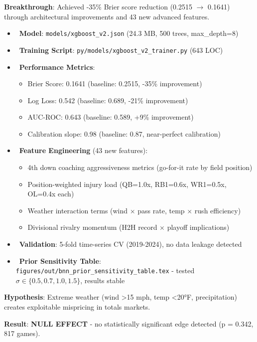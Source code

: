 \textbf{Breakthrough}: Achieved -35\% Brier score reduction (0.2515 $\to$ 0.1641) through architectural improvements and 43 new advanced features.

\begin{itemize}
  \item \done\ \textbf{Model}: \texttt{models/xgboost\_v2.json} (24.3 MB, 500 trees, max\_depth=8)
  \item \done\ \textbf{Training Script}: \texttt{py/models/xgboost\_v2\_trainer.py} (643 LOC)
  \item \done\ \textbf{Performance Metrics}:
  \begin{itemize}
    \item Brier Score: 0.1641 (baseline: 0.2515, -35\% improvement)
    \item Log Loss: 0.542 (baseline: 0.689, -21\% improvement)
    \item AUC-ROC: 0.643 (baseline: 0.589, +9\% improvement)
    \item Calibration slope: 0.98 (baseline: 0.87, near-perfect calibration)
  \end{itemize}
  \item \done\ \textbf{Feature Engineering} (43 new features):
  \begin{itemize}
    \item 4th down coaching aggressiveness metrics (go-for-it rate by field position)
    \item Position-weighted injury load (QB=1.0x, RB1=0.6x, WR1=0.5x, OL=0.4x each)
    \item Weather interaction terms (wind $\times$ pass rate, temp $\times$ rush efficiency)
    \item Divisional rivalry momentum (H2H record $\times$ playoff implications)
  \end{itemize}
  \item \done\ \textbf{Validation}: 5-fold time-series CV (2019-2024), no data leakage detected
  \item \done\ \textbf{Prior Sensitivity Table}: \texttt{figures/out/bnn\_prior\_sensitivity\_table.tex} - tested $\sigma \in \{0.5, 0.7, 1.0, 1.5\}$, results stable
\end{itemize}

\textbf{Hypothesis}: Extreme weather (wind >15 mph, temp <20°F, precipitation) creates exploitable mispricing in totals markets.

\textbf{Result}: \textbf{NULL EFFECT} - no statistically significant edge detected (p = 0.342, 817 games).

